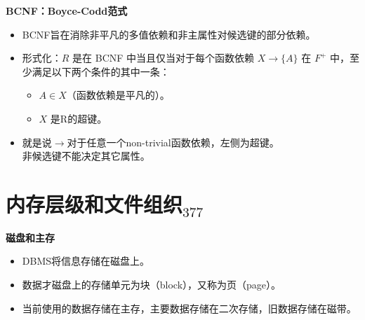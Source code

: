 \documentclass[b5paper, twoside]{article}
\let\oldtextbf\textbf
\renewcommand{\textbf}[1]{\textcolor{myblue}{\oldtextbf{#1}}}
\begin{document}
\textbf{BCNF：Boyce-Codd范式}
\begin{itemize}
    \item BCNF旨在消除非平凡的多值依赖和非主属性对候选键的部分依赖。
    \item 形式化：$R$ 是在 BCNF 中当且仅当对于每个函数依赖 $X \rightarrow \{A\}$ 
    在 $F^+$ 中，至少满足以下两个条件的其中一条：
    \begin{itemize}
        \item $A \in X$（函数依赖是平凡的）。
        \item $X$ 是R的超键。
    \end{itemize}
    \item 就是说$\rightarrow$对于任意一个non-trivial函数依赖，左侧为超键。\\
    非候选键不能决定其它属性。
\end{itemize}

\section{内存层级和文件组织$_{377}$}

\textbf{磁盘和主存}
\begin{itemize}
	\item DBMS将信息存储在磁盘上。
	\item 数据才磁盘上的存储单元为块（block），又称为页（page）。
	\item 当前使用的数据存储在主存，主要数据存储在二次存储，旧数据存储在磁带。
\end{itemize}
\end{document}
